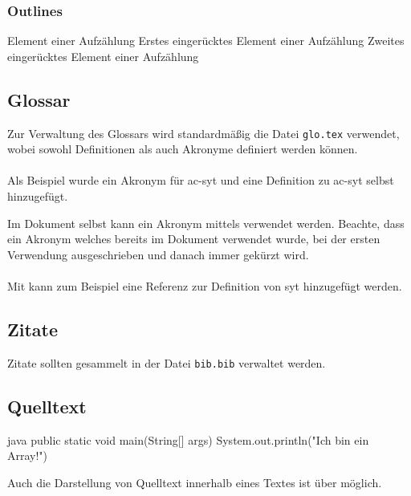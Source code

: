 \subsubsection{Outlines}
\begin{outline}
    \1 Element einer Aufzählung
        \2 Erstes eingerücktes Element einer Aufzählung
        \2 Zweites eingerücktes Element einer Aufzählung
\end{outline}

\newpage
\subsection{Glossar}
Zur Verwaltung des Glossars wird standardmäßig die Datei \texttt{glo.tex} verwendet, wobei sowohl Definitionen als auch Akronyme definiert werden können.
\\\\
Als Beispiel wurde ein Akronym für \gls{ac-syt} und eine Definition zu \gls{ac-syt} selbst hinzugefügt.


Im Dokument selbst kann ein Akronym mittels  verwendet werden. Beachte, dass ein Akronym welches bereits im Dokument verwendet wurde, bei der ersten Verwendung ausgeschrieben und danach immer gekürzt wird.
\\\\
Mit  kann zum Beispiel eine Referenz zur Definition von \gls{syt} hinzugefügt werden.

\subsection{Zitate}
Zitate sollten gesammelt in der Datei \texttt{bib.bib} verwaltet werden.

\newpage
\subsection{Quelltext}
\begin{listing}[H]
\begin{code}{java}
public static void main(String[] args) {
    System.out.println("Ich bin ein Array!")
}
\end{code}
\end{listing}

Auch die Darstellung von Quelltext innerhalb eines Textes ist über  möglich.


